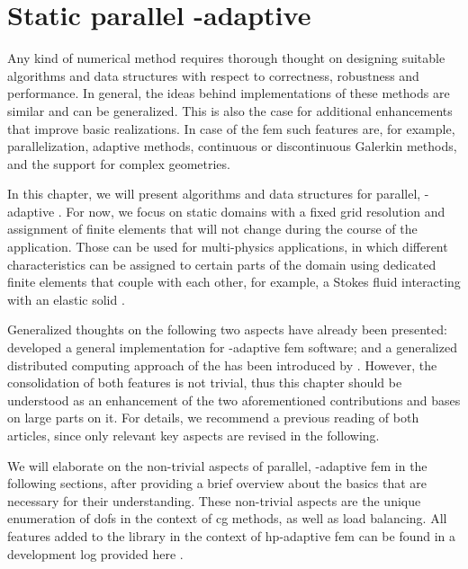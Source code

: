 \chapter{Static parallel \hp-adaptive }
\label{ch:parallel}
\glsresetall

Any kind of numerical method requires thorough thought on designing suitable algorithms and data structures with respect to correctness, robustness and performance. In general, the ideas behind implementations of these methods are similar and can be generalized.
This is also the case for additional enhancements that improve basic realizations. In case of the \gls{fem} such features are, for example, parallelization, adaptive methods, continuous or discontinuous Galerkin methods, and the support for complex geometries.

In this chapter, we will present algorithms and data structures for parallel, \hp-adaptive . For now, we focus on static domains with a fixed grid resolution and assignment of finite elements that will not change during the course of the application. Those can be used for multi-physics applications, in which different characteristics can be assigned to certain parts of the domain using dedicated finite elements that couple with each other, for example, a Stokes fluid interacting with an elastic solid \textcite{dealiistep-46}.

Generalized thoughts on the following two aspects have already been presented: \textcite{bangerth2009} developed a general implementation for \hp-adaptive \gls{fem} software; and a generalized distributed computing approach of the  has been introduced by \textcite{bangerth2012}. However, the consolidation of both features is not trivial, thus this chapter should be understood as an enhancement of the two aforementioned contributions and bases on large parts on it. For details, we recommend a previous reading of both articles, since only relevant key aspects are revised in the following.

We will elaborate on the non-trivial aspects of parallel, \hp-adaptive \gls{fem} in the following sections, after providing a brief overview about the basics that are necessary for their understanding. These non-trivial aspects are the unique enumeration of \glspl{dof} in the context of \gls{cg} methods, as well as load balancing. All features added to the \dealii{} library in the context of hp-adaptive \gls{fem} can be found in a development log provided here \textcite{dealiiissue3511}.





